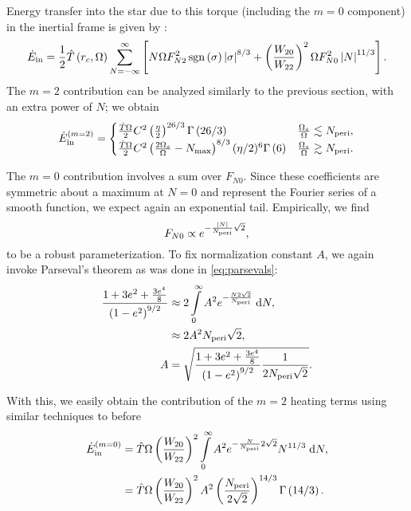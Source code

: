 \documentclass[
        fleqn,
        usenatbib,
        referee,
    ]{mnras}
\newcommand*{\abs}[1]{\left|#1\right|}
\newcommand*{\p}[1]{\left(#1\right)}
\newcommand*{\s}[1]{\left[#1\right]}
\DeclareMathOperator*{\sgn}{sgn}
\begin{document}
Energy transfer into the star due to this torque (including the $m = 0$
component) in the inertial frame is given by \citealp{vlf}:
\begin{align}
     \dot{E}_{\rm in} = \frac{1}{2}\hat{T}\p{r_c, \Omega}
         \sum\limits_{N = -\infty}^\infty\s{
            N\Omega F_{N2}^2 \sgn \p{\sigma} \abs{\sigma}^{8/3}
            + \p{\frac{W_{20}}{W_{22}}}^2\Omega F_{N0}^2 \abs{N}^{11/3}}.
            \label{eq:e_sum}
\end{align}
The $m=2$ contribution can be analyzed similarly to the previous section, with
an extra power of $N$; we obtain
\begin{equation}
    \dot{E}_{\rm in}^{(m = 2)} =
    \begin{cases}
        \frac{\hat{T}\Omega }{2} C^2
            \p{\frac{\eta}{2}}^{26/3}\Gamma\p{26/3} &
                \frac{\Omega_s}{\Omega} \lesssim N_{\rm peri},\\
        \frac{\hat{T}\Omega}{2} C^2
            \p{\frac{2\Omega_s}{\Omega} - N_{\max}}^{8/3}
                (\eta/2)^{6} \Gamma\p{6} &
                \frac{\Omega_s}{\Omega} \gtrsim N_{\rm peri}.
    \end{cases}
\end{equation}

The $m=0$ contribution involves a sum over $F_{N0}$. Since these coefficients
are symmetric about a maximum at $N = 0$ and represent the Fourier series of a
smooth function, we expect again an exponential tail. Empirically, we find
\begin{equation}
    F_{N0} \propto e^{-\frac{\abs{N}}{N_{\rm peri}}\sqrt{2}},
\end{equation}
to be a robust parameterization. To fix normalization constant $A$, we again
invoke Parseval's theorem as was done in \autoref{eq:parsevals}:
\begin{align}
    \frac{1 + 3e^2 + \frac{3e^4}{8}}{\p{1 - e^2}^{9/2}}
        &\approx 2\int\limits_0^\infty A^2e^{-\frac{N2\sqrt{2}}{N_{\rm peri}}}
            \;\mathrm{d}N,\\
        &\approx 2A^2N_{\rm peri}\sqrt{2},\\
    A &= \sqrt{\frac{1 + 3e^2 + \frac{3e^4}{8}}{\p{1 - e^2}^{9/2}}
        \frac{1}{2N_{\rm peri}\sqrt{2}}}.
\end{align}

With this, we easily obtain the contribution of the $m = 2$ heating terms using
similar techniques to before
\begin{align}
    \dot{E}_{\rm in}^{(m = 0)} &= \hat{T}\Omega
        \p{\frac{W_{20}}{W_{22}}}^2 \int\limits_0^\infty
            A^2 e^{-\frac{N}{N_{\rm peri}}2\sqrt{2}}N^{11/3}\;\mathrm{d}N,\\
        &= \hat{T} \Omega \p{\frac{W_{20}}{W_{22}}}^2 A^2
            \p{\frac{N_{\rm peri}}{2\sqrt{2}}}^{14/3}
            \Gamma\p{14/3}.
\end{align}
\end{document}

